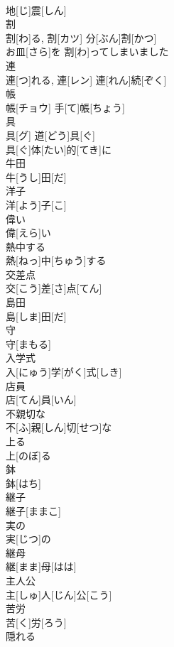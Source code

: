 \documentclass[8pt]{extreport}
\begin{document}
\begin{CJK}{UTF8}{min}
\\	地[じ]震[しん] 
\\	割	
\\	割[わ]る, 割[カツ]	分[ぶん]割[かつ] 
\\	お皿[さら]を 割[わ]ってしまいました 
\\	連	
\\	連[つ]れる, 連[レン]	連[れん]続[ぞく] 
\\	帳	
\\	帳[チョウ]	手[て]帳[ちょう] 
\\	具	
\\	具[グ]	道[どう]具[ぐ] 
\\	具[ぐ]体[たい]的[てき]に 
\\	牛田	
\\	牛[うし]田[だ]	
\\	洋子	
\\	洋[よう]子[こ]	
\\	偉い	
\\	偉[えら]い	
\\	熱中する	
\\	熱[ねっ]中[ちゅう]する	
\\	交差点	
\\	交[こう]差[さ]点[てん]	
\\	島田	
\\	島[しま]田[だ]	
\\	守	
\\	守[まもる]	
\\	入学式	
\\	入[にゅう]学[がく]式[しき]	
\\	店員	
\\	店[てん]員[いん]	
\\	不親切な	
\\	不[ふ]親[しん]切[せつ]な	
\\	上る	
\\	上[のぼ]る	
\\	鉢	
\\	鉢[はち]	
\\	継子	
\\	継子[ままこ]	
\\	実の	
\\	実[じつ]の	
\\	継母	
\\	継[まま]母[はは]	
\\	主人公	
\\	主[しゅ]人[じん]公[こう]	
\\	苦労	
\\	苦[く]労[ろう]	
\\	隠れる	

\end{CJK}
\end{document}
